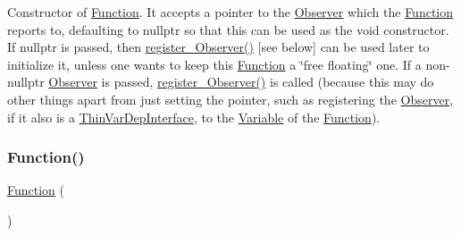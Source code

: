 Constructor of \mbox{\hyperlink{class_s_m_spp__di__unipi__it_1_1_function}{Function}}. It accepts a pointer to the \mbox{\hyperlink{class_s_m_spp__di__unipi__it_1_1_observer}{Observer}} which the \mbox{\hyperlink{class_s_m_spp__di__unipi__it_1_1_function}{Function}} reports to, defaulting to nullptr so that this can be used as the void constructor. If nullptr is passed, then \mbox{\hyperlink{class_s_m_spp__di__unipi__it_1_1_function_a98c3b08492e868f06dfc9b5ada04cb8a}{register\+\_\+\+Observer()}} \mbox{[}see below\mbox{]} can be used later to initialize it, unless one wants to keep this \mbox{\hyperlink{class_s_m_spp__di__unipi__it_1_1_function}{Function}} a \char`\"{}free floating\char`\"{} one. If a non-\/nullptr \mbox{\hyperlink{class_s_m_spp__di__unipi__it_1_1_observer}{Observer}} is passed, \mbox{\hyperlink{class_s_m_spp__di__unipi__it_1_1_function_a98c3b08492e868f06dfc9b5ada04cb8a}{register\+\_\+\+Observer()}} is called (because this may do other things apart from just setting the pointer, such as registering the \mbox{\hyperlink{class_s_m_spp__di__unipi__it_1_1_observer}{Observer}}, if it also is a \mbox{\hyperlink{class_s_m_spp__di__unipi__it_1_1_thin_var_dep_interface}{Thin\+Var\+Dep\+Interface}}, to the \mbox{\hyperlink{class_s_m_spp__di__unipi__it_1_1_variable}{Variable}} of the \mbox{\hyperlink{class_s_m_spp__di__unipi__it_1_1_function}{Function}}). \mbox{\label{class_s_m_spp__di__unipi__it_1_1_function_ae0dc5d12ae80e0815315a10e7c3c25ab}} 
\subsubsection{\texorpdfstring{Function()}{Function()}\hspace{0.1cm}{\footnotesize\ttfamily [2/2]}}
{\footnotesize\ttfamily \mbox{\hyperlink{class_s_m_spp__di__unipi__it_1_1_function}{Function}} (\begin{DoxyParamCaption}\item[{const \mbox{\hyperlink{class_s_m_spp__di__unipi__it_1_1_function}{Function}} \&}]{ }\end{DoxyParamCaption})\hspace{0.3cm}{\ttfamily [inline]}}



